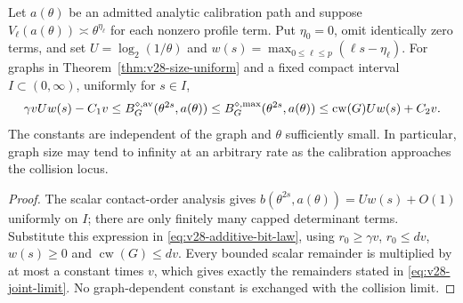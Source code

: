 \begin{corollary}
\label{cor:v28-joint-limit}
Let $a(\theta)$ be an admitted analytic calibration path and suppose
$V_\ell(a(\theta))\asymp\theta^{\eta_\ell}$ for each nonzero
profile term. Put $\eta_0=0$, omit identically zero terms, and set
$U=\log_2(1/\theta)$ and
$w(s)=\max_{0\le\ell\le p}(\ell s-\eta_\ell)$.
For graphs in Theorem~\ref{thm:v28-size-uniform} and a fixed compact
interval $I\subset(0,\infty)$, uniformly for $s\in I$,
\begin{equation}\label{eq:v28-joint-limit}
 \gamma v U w(s)-C_1v
 \le B_G^{\diamond,\rm av}(\theta^{2s},a(\theta))
 \le B_G^{\diamond,\rm max}(\theta^{2s},a(\theta))
 \le \operatorname{cw}(G)U w(s)+C_2v.
\end{equation}
The constants are independent of the graph and $\theta$ sufficiently
small. In particular, graph size may tend to infinity at an arbitrary
rate as the calibration approaches the collision locus.
\end{corollary}
\begin{proof}
The scalar contact-order analysis gives
$b(\theta^{2s},a(\theta))=Uw(s)+O(1)$ uniformly on $I$; there are
only finitely many capped determinant terms. Substitute this expression
in \eqref{eq:v28-additive-bit-law}, using
$r_0\ge\gamma v$, $r_0\le dv$, $w(s)\ge0$ and
$\operatorname{cw}(G)\le dv$. Every bounded scalar remainder is
multiplied by at most a constant times $v$, which gives exactly the
remainders stated in \eqref{eq:v28-joint-limit}. No graph-dependent
constant is exchanged with the collision limit.
\end{proof}
